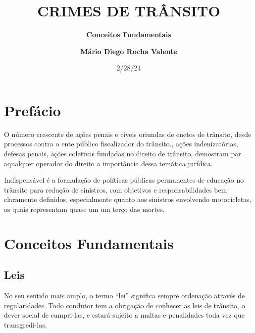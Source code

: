 \documentclass[
  letterpaper,
  DIV=11,
  numbers=noendperiod]{scrreport}
\title{\textbf{CRIMES DE TRÂNSITO}}
\subtitle{\textbf{Conceitos Fundamentais}}
\author{\textbf{Mário Diego Rocha Valente}}
\date{2/28/24}
\renewcommand*\contentsname{Table of contents}
\newcommand\contentsname{Table of contents}
\begin{document}
\maketitle
\ifdefined\Shaded\renewenvironment{Shaded}{\begin{tcolorbox}[boxrule=0pt, enhanced, interior hidden, borderline west={3pt}{0pt}{shadecolor}, breakable, sharp corners, frame hidden]}{\end{tcolorbox}}\fi

\renewcommand*\contentsname{Table of contents}
{
\hypersetup{linkcolor=}
\setcounter{tocdepth}{2}
\tableofcontents
}

\hypertarget{prefuxe1cio}{%
\chapter*{Prefácio}\label{prefuxe1cio}}


O número crescente de ações penais e cíveis oriundas de enetos de
trânsito, desde processos contra o ente público fiscalizador do
trânsito., ações indenizatórias, defesas penais, ações coletivas
fundadas no direito de trânsito, demostram par aqualquer operador do
direito a importância dessa temática jurídica.

Indispensável é a formulação de políticas públicas permanentes de
educação no trânsito para redução de sinistros, com objetivos e
responsabilidades bem claramente definidos, especialmente quanto aos
sinistros envolvendo motocicletas, os quais representam quase um um
terço das mortes.


\hypertarget{conceitos-fundamentais}{%
\chapter{Conceitos Fundamentais}\label{conceitos-fundamentais}}

\hypertarget{leis}{%
\section{Leis}\label{leis}}

No seu sentido mais amplo, o termo ``lei'' significa sempre ordenação
através de regularidades. Todo condutor tem a obrigação de conhecer as
leis de trânsito, o dever social de cumpri-las, e estará sujeito a
multas e penalidades toda vez que transgredi-las.
\end{document}
